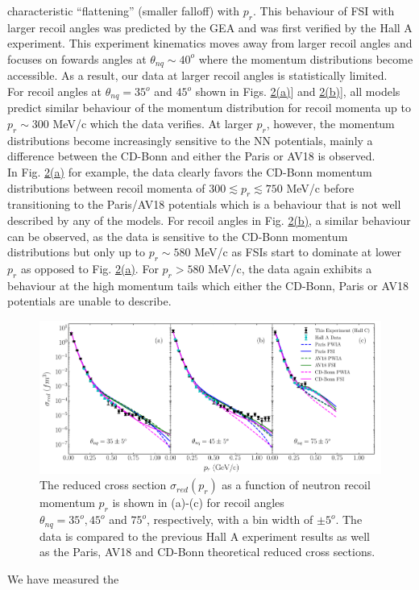characteristic ``flattening'' (smaller falloff) with $p_{r}$. This behaviour of FSI with larger recoil angles was predicted by the GEA and was first verified by the Hall A experiment.
This experiment kinematics moves away from larger recoil angles and focuses on fowards angles at $\theta_{nq}\sim 40^{o}$ where the momentum distributions become accessible. As a result, our data at larger recoil angles
is statistically limited. \\
\indent For recoil angles at $\theta_{nq}=35^{o}$ and $45^{o}$ shown in Figs. \hyperref[fig:fig2]{2(a)}] and  \hyperref[fig:fig2]{2(b)}],  all models predict similar behaviour of the momentum distribution for recoil momenta up to $p_{r}\sim$300 MeV/c which the data verifies. At larger $p_{r}$,
however, the momentum distributions become increasingly sensitive to the NN potentials, mainly a difference between the CD-Bonn and either the Paris or AV18 is observed. \\
\indent In Fig. \hyperref[fig:fig2]{2(a)} for example, the data clearly favors the CD-Bonn momentum distributions between recoil momenta of $300\lesssim p_{r}\lesssim750$ MeV/c before transitioning to the Paris/AV18 potentials which is a behaviour that is not well described by any of the models.
For recoil angles in Fig. \hyperref[fig:fig2]{2(b)}, a similar behaviour can be observed, as the data is sensitive to the CD-Bonn momentum distributions but only up to $p_{r}\sim 580$ MeV/c as FSIs start to dominate at lower $p_{r}$
as opposed to Fig. \hyperref[fig:fig2]{2(a)}. For $p_{r}>580$ MeV/c, the data again exhibits a behaviour at the high momentum tails which either the CD-Bonn, Paris or AV18 potentials are unable to describe.
\onecolumngrid

\begin{figure}[bh!]
\includegraphics[scale=0.5]{prl_plots/PRL_plot1.pdf}
\caption{The reduced cross section $\sigma_{red}(p_{r})$ as a function of neutron recoil momentum $p_{r}$ is shown in (a)-(c) for recoil angles \\  $\theta_{nq}=35^{o}, 45^{o}$ and $75^{o}$, respectively,
with a bin width of $\pm 5^{o}$. The data is compared to the previous Hall A experiment results as well as the Paris, AV18 and CD-Bonn theoretical reduced cross sections.}
\label{fig:fig2}
\end{figure}

\twocolumngrid
\indent We have measured the 


